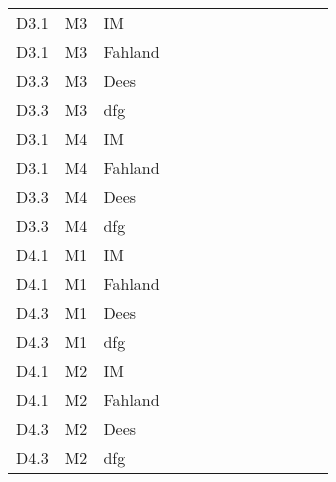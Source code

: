 \begin{table}[]
{\begin{tabular}{lll|llllllll|ll}
			D3.1      & M3              & IM  &     &    &     &     &        &           &          &      &                   &                     \\
			D3.1      & M3              & Fahland   &     &    &     &     &        &           &          &      &                   &                     \\
			D3.3      & M3              & Dees      &     &    &     &     &        &           &          &      &                   &                     \\
			D3.3      & M3              & dfg       &     &    &     &     &        &           &          &      &                   &                     \\
			D3.1      & M4              & IM  &     &    &     &     &        &           &          &      &                   &                     \\
			D3.1      & M4              & Fahland   &     &    &     &     &        &           &          &      &                   &                     \\
			D3.3      & M4              & Dees      &     &    &     &     &        &           &          &      &                   &                     \\
			D3.3      & M4              & dfg       &     &    &     &     &        &           &          &      &                   &                     \\
			D4.1      & M1              & IM &     &    &     &     &        &           &          &      &                   &                     \\
			D4.1      & M1              & Fahland   &     &    &     &     &        &           &          &      &                   &                     \\
			D4.3      & M1              & Dees      &     &    &     &     &        &           &          &      &                   &                     \\
			D4.3      & M1              & dfg       &     &    &     &     &        &           &          &      &                   &                     \\
			D4.1      & M2              & IM  &     &    &     &     &        &           &          &      &                   &                     \\
			D4.1      & M2              & Fahland   &     &    &     &     &        &           &          &      &                   &                     \\
			D4.3      & M2              & Dees      &     &    &     &     &        &           &          &      &                   &                     \\
			D4.3      & M2              & dfg       &     &    &     &     &        &           &          &      &                   &      
			\\ \hline              
		\end{tabular}}
	
	\end{table}
